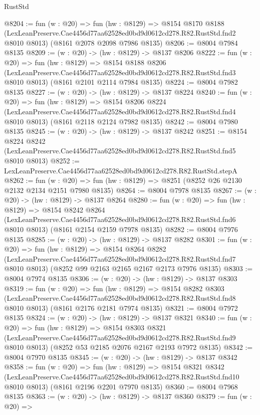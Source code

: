 \begin{lexlean}{RustStd}
\begin{coremodule}
@8204 := fun (w : @20) =>
  fun (hw : @8129) =>
  @8154
    @8170
    @8188
    (LexLeanPreserve.Cae4456d77aa62528ed0bd9d0612cd278.R82.RustStd.fnd2 @8010 @8013)
    (@8161 @2078 @2098 @7986 @8135)
@8206 := @8004 @7984 @8135
@8209 := (w : @20) -> (hw : @8129) -> @8137 @8206
@8222 := fun (w : @20) =>
  fun (hw : @8129) =>
  @8154
    @8188
    @8206
    (LexLeanPreserve.Cae4456d77aa62528ed0bd9d0612cd278.R82.RustStd.fnd3 @8010 @8013)
    (@8161 @2101 @2114 @7984 @8135)
@8224 := @8004 @7982 @8135
@8227 := (w : @20) -> (hw : @8129) -> @8137 @8224
@8240 := fun (w : @20) =>
  fun (hw : @8129) =>
  @8154
    @8206
    @8224
    (LexLeanPreserve.Cae4456d77aa62528ed0bd9d0612cd278.R82.RustStd.fnd4 @8010 @8013)
    (@8161 @2118 @2124 @7982 @8135)
@8242 := @8004 @7980 @8135
@8245 := (w : @20) -> (hw : @8129) -> @8137 @8242
@8251 := @8154
    @8224
    @8242
    (LexLeanPreserve.Cae4456d77aa62528ed0bd9d0612cd278.R82.RustStd.fnd5 @8010 @8013)
@8252 := LexLeanPreserve.Cae4456d77aa62528ed0bd9d0612cd278.R82.RustStd.stepA
@8262 := fun (w : @20) => fun (hw : @8129) => @8251 (@8252 @26 @2130 @2132 @2134 @2151 @7980 @8135)
@8264 := @8004 @7978 @8135
@8267 := (w : @20) -> (hw : @8129) -> @8137 @8264
@8280 := fun (w : @20) =>
  fun (hw : @8129) =>
  @8154
    @8242
    @8264
    (LexLeanPreserve.Cae4456d77aa62528ed0bd9d0612cd278.R82.RustStd.fnd6 @8010 @8013)
    (@8161 @2154 @2159 @7978 @8135)
@8282 := @8004 @7976 @8135
@8285 := (w : @20) -> (hw : @8129) -> @8137 @8282
@8301 := fun (w : @20) =>
  fun (hw : @8129) =>
  @8154
    @8264
    @8282
    (LexLeanPreserve.Cae4456d77aa62528ed0bd9d0612cd278.R82.RustStd.fnd7 @8010 @8013)
    (@8252 @99 @2163 @2165 @2167 @2173 @7976 @8135)
@8303 := @8004 @7974 @8135
@8306 := (w : @20) -> (hw : @8129) -> @8137 @8303
@8319 := fun (w : @20) =>
  fun (hw : @8129) =>
  @8154
    @8282
    @8303
    (LexLeanPreserve.Cae4456d77aa62528ed0bd9d0612cd278.R82.RustStd.fnd8 @8010 @8013)
    (@8161 @2176 @2181 @7974 @8135)
@8321 := @8004 @7972 @8135
@8324 := (w : @20) -> (hw : @8129) -> @8137 @8321
@8340 := fun (w : @20) =>
  fun (hw : @8129) =>
  @8154
    @8303
    @8321
    (LexLeanPreserve.Cae4456d77aa62528ed0bd9d0612cd278.R82.RustStd.fnd9 @8010 @8013)
    (@8252 @53 @2185 @2076 @2167 @2193 @7972 @8135)
@8342 := @8004 @7970 @8135
@8345 := (w : @20) -> (hw : @8129) -> @8137 @8342
@8358 := fun (w : @20) =>
  fun (hw : @8129) =>
  @8154
    @8321
    @8342
    (LexLeanPreserve.Cae4456d77aa62528ed0bd9d0612cd278.R82.RustStd.fnd10 @8010 @8013)
    (@8161 @2196 @2201 @7970 @8135)
@8360 := @8004 @7968 @8135
@8363 := (w : @20) -> (hw : @8129) -> @8137 @8360
@8379 := fun (w : @20) =>

\end{coremodule}
\end{lexlean}
